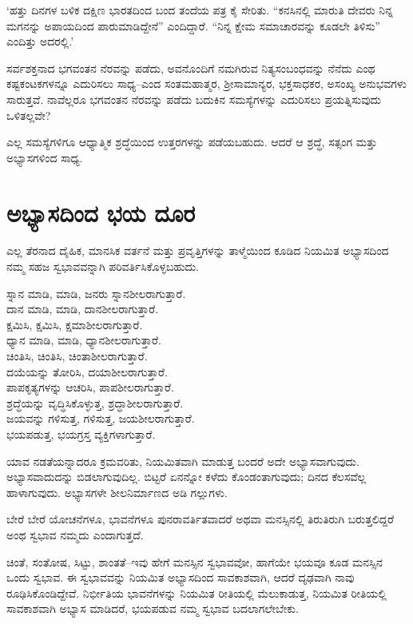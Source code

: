 ‘ಹತ್ತು ದಿನಗಳ ಬಳಿಕ ದಕ್ಷಿಣ ಭಾರತದಿಂದ ಬಂದ ತಂದೆಯ ಪತ್ರ ಕೈ ಸೇರಿತು. “ಕನಸಿನಲ್ಲಿ ಮಾರುತಿ ದೇವರು ನಿನ್ನ ಮಗನನ್ನು ಅಪಾಯದಿಂದ ಪಾರುಮಾಡಿದ್ದೇನೆ” ಎಂದಿದ್ದಾರೆ. “ನಿನ್ನ ಕ್ಷೇಮ ಸಮಾಚಾರವನ್ನು ಕೂಡಲೇ ತಿಳಿಸು” ಎಂದಿತ್ತು ಅದರಲ್ಲಿ.’

ಸರ್ವಶಕ್ತನಾದ ಭಗವಂತನ ನೆರವನ್ನು ಪಡೆದು, ಅವನೊಂದಿಗೆ ನಮಗಿರುವ ನಿತ್ಯಸಂಬಂಧವನ್ನು ನೆನೆದು ಎಂಥ ಕಷ್ಟಕಂಟಕಗಳನ್ನೂ ಎದುರಿಸಲು ಸಾಧ್ಯ–ಎಂದ ಸಂತಮಹಾತ್ಮರ, ಶ‍್ರೀ\-ಸಾಮಾನ್ಯರ, ಭಕ್ತಸಾಧಕರ, ಅಸಂಖ್ಯ ಅನುಭವಗಳು ಸಾರುತ್ತವೆ. ನಾವೆಲ್ಲರೂ ಭಗವಂತನ ನೆರವನ್ನು ಪಡೆದು ಬದುಕಿನ ಸಮಸ್ಯೆಗಳನ್ನು ಎದುರಿಸಲು ಪ್ರಯತ್ನಿಸುವುದು ಒಳಿತಲ್ಲವೇ?

ಎಲ್ಲ ಸಮಸ್ಯೆಗಳಿಗೂ ಆಧ್ಯಾತ್ಮಿಕ ಶ್ರದ್ಧೆಯಿಂದ ಉತ್ತರಗಳನ್ನು ಪಡೆಯಬಹುದು. ಆದರೆ ಆ ಶ್ರದ್ಧೆ, ಸತ್ಸಂಗ ಮತ್ತು ಅಭ್ಯಾಸಗಳಿಂದ ಸಾಧ್ಯ.


\section*{ಅಭ್ಯಾಸದಿಂದ ಭಯ ದೂರ}


ಎಲ್ಲ ತೆರನಾದ ದೈಹಿಕ, ಮಾನಸಿಕ ವರ್ತನೆ ಮತ್ತು ಪ್ರವೃತ್ತಿಗಳನ್ನು ತಾಳ್ಮೆಯಿಂದ ಕೂಡಿದ ನಿಯಮಿತ ಅಭ್ಯಾಸದಿಂದ ನಮ್ಮ ಸಹಜ ಸ್ವಭಾವವನ್ನಾಗಿ ಪರಿವರ್ತಿಸಿಕೊಳ್ಳಬಹುದು.

{\noindent\leftskip=0.6cm ಸ್ನಾನ ಮಾಡಿ, ಮಾಡಿ, ಜನರು ಸ್ನಾನಶೀಲರಾಗುತ್ತಾರೆ.\\
 ದಾನ ಮಾಡಿ, ಮಾಡಿ, ದಾನಶೀಲರಾಗುತ್ತಾರೆ.\\
 ಕ್ಷಮಿಸಿ, ಕ್ಷಮಿಸಿ, ಕ್ಷಮಾಶೀಲರಾಗುತ್ತಾರೆ.\\
 ಧ್ಯಾನ ಮಾಡಿ, ಮಾಡಿ, ಧ್ಯಾನಶೀಲರಾಗುತ್ತಾರೆ.\\
 ಚಿಂತಿಸಿ, ಚಿಂತಿಸಿ, ಚಿಂತಾಶೀಲರಾಗುತ್ತಾರೆ.\\
 ದಯೆಯನ್ನು ತೋರಿಸಿ, ದಯಾಶೀಲರಾಗುತ್ತಾರೆ.\\
 ಪಾಪಕೃತ್ಯಗಳನ್ನು ಆಚರಿಸಿ, ಪಾಪಶೀಲರಾಗುತ್ತಾರೆ.\\
 ಶ್ರದ್ಧೆಯನ್ನು ವೃದ್ಧಿಸಿಕೊಳ್ಳುತ್ತ, ಶ್ರದ್ಧಾಶೀಲರಾಗುತ್ತಾರೆ.\\
 ಜಯವನ್ನು ಗಳಿಸುತ್ತ, ಗಳಿಸುತ್ತ, ಜಯಶೀಲರಾಗುತ್ತಾರೆ.\\
 ಭಯಪಡುತ್ತ, ಭಯಗ್ರಸ್ತ ವ್ಯಕ್ತಿಗಳಾಗುತ್ತಾರೆ.\par}

ಯಾವ ನಡತೆಯನ್ನಾದರೂ ಕ್ರಮವರಿತು, ನಿಯಮಿತವಾಗಿ ಮಾಡುತ್ತ ಬಂದರೆ ಅದೇ ಅಭ್ಯಾಸವಾಗುವುದು. ಅಭ್ಯಾಸವಾದುದನ್ನು ಬಿಡಲಾಗುವುದಿಲ್ಲ. ಬಿಟ್ಟರೆ ಏನನ್ನೋ ಕಳೆದು ಕೊಂಡಂತಾಗುವುದು; ದಿನದ ಕೆಲಸವೆಲ್ಲ ಹಾಳಾಗುವುದು. ಅಭ್ಯಾಸಗಳೇ ಶೀಲನಿರ್ಮಾಣದ ಅಡಿ ಗಲ್ಲುಗಳು.

ಬೇರೆ ಬೇರೆ ಯೋಚನೆಗಳೂ, ಭಾವನೆಗಳೂ ಪುನರಾವರ್ತಿತವಾದರೆ ಅಥವಾ ಮನಸ್ಸಿನಲ್ಲಿ ತಿರುತಿರುಗಿ ಬರುತ್ತಲಿದ್ದರೆ ಅಂಥ ಸ್ವಭಾವ ನಮ್ಮದು ಎಂದಾಗುತ್ತದೆ.

ಚಿಂತೆ, ಸಂತೋಷ, ಸಿಟ್ಟು, ಶಾಂತತೆ–ಇವು ಹೇಗೆ ಮನಸ್ಸಿನ ಸ್ವಭಾವವೋ, ಹಾಗೆಯೇ ಭಯವೂ ಕೂಡ ಮನಸ್ಸಿನ ಒಂದು ಸ್ವಭಾವ. ಈ ಸ್ವಭಾವವನ್ನು ನಿಯಮಿತ ಅಭ್ಯಾಸದಿಂದ ಸಾವಕಾಶವಾಗಿ, ಆದರೆ ದೃಢವಾಗಿ ನಾವು ರೂಢಿಸಿಕೊಂಡಿದ್ದೇವೆ. ನಿರ್ಭೀತಿಯ ಭಾವನೆಗಳನ್ನು ನಿಯಮಿತ ರೀತಿಯಲ್ಲಿ ಮೆಲುಕಾಡುತ್ತ, ನಿಯಮಿತ ರೀತಿಯಲ್ಲಿ ಸಾವಕಾಶವಾಗಿ ಅಭ್ಯಾಸ ಮಾಡಿದರೆ, ಭಯಪಡುವ ನಮ್ಮ ಸ್ವಭಾವ ಬದಲಾಗಲೇಬೇಕು.

